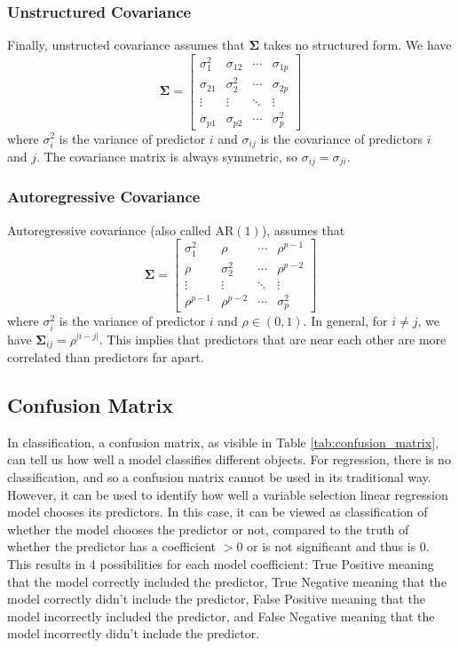 \documentclass{article}
\begin{document}
\subsubsection{Unstructured Covariance}
Finally, unstructed covariance assumes that $\mathbf{\Sigma}$ takes no structured form. We have
\begin{equation}
	\mathbf{\Sigma} = \begin{bmatrix}
		\sigma_1^2 & \sigma_{12} & \cdots & \sigma_{1p}\\
		\sigma_{21} & \sigma_2^2 & \cdots & \sigma_{2p}\\
		\vdots & \vdots & \ddots & \vdots \\
		\sigma_{p1} & \sigma_{p2} & \cdots & \sigma_p^2
	\end{bmatrix}	
\end{equation}
where $\sigma_i^2$ is the variance of predictor $i$ and $\sigma_{ij}$ is the covariance of predictors $i$ and $j$. The covariance matrix is always symmetric, so $\sigma_{ij} = \sigma_{ji}$.

\subsubsection{Autoregressive Covariance}
Autoregressive covariance (also called $\text{AR}(1)$), assumes that
\begin{equation}
	\mathbf{\Sigma} = \begin{bmatrix}
		\sigma_1^2 & \rho & \cdots & \rho^{p - 1}\\
		\rho & \sigma_2^2 & \cdots & \rho^{p - 2}\\
		\vdots & \vdots & \ddots & \vdots\\
		\rho^{p - 1} & \rho^{p - 2} & \cdots & \sigma_p^2
	\end{bmatrix}
\end{equation}
where $\sigma_i^2$ is the variance of predictor $i$ and $\rho \in (0, 1)$. In general, for $i\neq j$, we have $\mathbf{\Sigma}_{ij} = \rho^{\vert i - j\vert}$. This implies that predictors that are near each other are more correlated than predictors far apart.

\subsection{Confusion Matrix}
In classification, a confusion matrix, as visible in Table \ref{tab:confusion_matrix}, can tell us how well a model classifies different objects. For regression, there is no classification, and so a confusion matrix cannot be used in its traditional way. However, it can be used to identify how well a variable selection linear regression model chooses its predictors. In this case, it can be viewed as classification of whether the model chooses the predictor or not, compared to the truth of whether the predictor has a coefficient $> 0$ or is not significant and thus is 0. This results in 4 possibilities for each model coefficient: True Positive meaning that the model correctly included the predictor, True Negative meaning that the model correctly didn't include the predictor, False Positive meaning that the model incorrectly included the predictor, and False Negative meaning that the model incorrectly didn't include the predictor.
\end{document}
